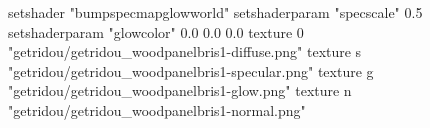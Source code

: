 setshader "bumpspecmapglowworld"
setshaderparam "specscale" 0.5
setshaderparam "glowcolor" 0.0 0.0 0.0
texture 0 "getridou/getridou_woodpanelbris1-diffuse.png"
texture s "getridou/getridou_woodpanelbris1-specular.png"
texture g "getridou/getridou_woodpanelbris1-glow.png"
texture n "getridou/getridou_woodpanelbris1-normal.png"
